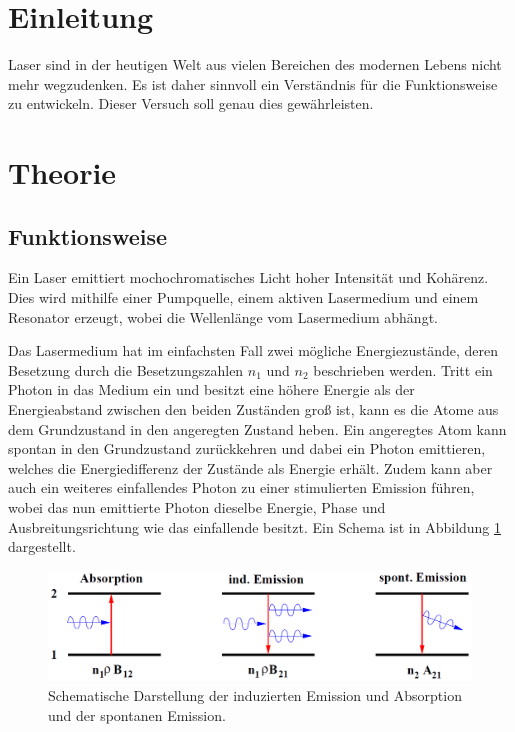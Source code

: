 \section{Einleitung} %
\label{sec:einleitung}

Laser sind in der heutigen Welt aus vielen Bereichen des modernen Lebens nicht mehr wegzudenken.
Es ist daher sinnvoll ein Verständnis für die Funktionsweise zu entwickeln.
Dieser Versuch soll genau dies gewährleisten.

\section{Theorie} %
\label{sec:theorie}

\subsection{Funktionsweise} %
\label{sub:was_ist_ein_laser_}

Ein Laser emittiert mochochromatisches Licht hoher Intensität und Kohärenz.
Dies wird mithilfe einer Pumpquelle, einem aktiven Lasermedium und einem Resonator erzeugt, wobei die Wellenlänge vom Lasermedium abhängt.

Das Lasermedium hat im einfachsten Fall zwei mögliche Energiezustände, deren Besetzung durch die Besetzungszahlen $n_1$ und $n_2$ beschrieben werden.
Tritt ein Photon in das Medium ein und besitzt eine höhere Energie als der Energieabstand zwischen den beiden Zuständen groß ist, kann es die Atome aus dem Grundzustand in den angeregten Zustand heben.
Ein angeregtes Atom kann spontan in den Grundzustand zurückkehren und dabei ein Photon emittieren, welches die Energiedifferenz der Zustände als Energie erhält.
Zudem kann aber auch ein weiteres einfallendes Photon zu einer stimulierten Emission führen, wobei das nun emittierte Photon dieselbe Energie, Phase und Ausbreitungsrichtung wie das einfallende besitzt.
Ein Schema ist in Abbildung \ref{Emission} dargestellt.

\begin{figure}[h!]
\centering
	\includegraphics[width = 12cm]{img/Emission.png}
	\caption{Schematische Darstellung der induzierten Emission und Absorption und der spontanen Emission.\cite{V61}}
	\label{Emission}
\end{figure}

